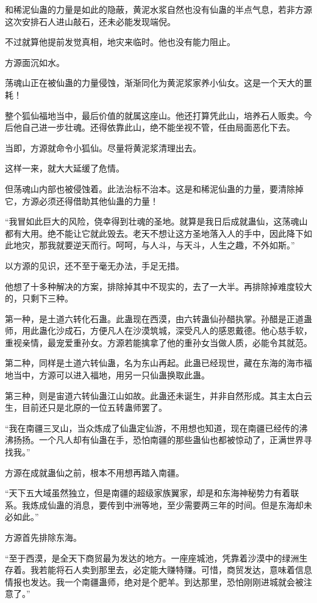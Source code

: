 \begin{this_body}
和稀泥仙蛊的力量是如此的隐蔽，黄泥水浆自然也没有仙蛊的半点气息，若非方源这次安排石人进山敲石，还未必能发现端倪。

不过就算他提前发觉真相，地灾来临时。他也没有能力阻止。

方源面沉如水。

荡魂山正在被仙蛊的力量侵蚀，渐渐同化为黄泥浆家养小仙女。这是一个天大的噩耗！

整个狐仙福地当中，最后价值的就属这座山。他还打算凭此山，培养石人贩卖。今后他自己进一步壮魂。还得依靠此山，绝不能坐视不管，任由局面恶化下去。

当即，方源就命令小狐仙。尽量将黄泥浆清理出去。

这样一来，就大大延缓了危情。

但荡魂山内部也被侵蚀着。此法治标不治本。这是和稀泥仙蛊的力量，要清除掉它，方源必须还得借助其他仙蛊的力量！

“我冒如此巨大的风险，侥幸得到壮魂的圣地。就算是我日后成就蛊仙，这荡魂山都有大用。绝不能让它就此毁去。老天不想让这方圣地落入人的手中，因此降下如此地灾，那我就要逆天而行。呵呵，与人斗，与天斗，人生之趣，不外如斯。”

以方源的见识，还不至于毫无办法，手足无措。

他想了十多种解决的方案，排除掉其中不现实的，去了一大半。再排除掉难度较大的，只剩下三种。

第一种，是土道六转化石蛊。此蛊现在西漠，由六转蛊仙孙醋执掌。孙醋是正道蛊师，用此蛊化沙成石，方便凡人在沙漠筑城，深受凡人的感恩戴德。他心慈手软，重视亲情，最宠爱重孙女。方源若能擒拿了他的重孙女当做人质，必能令其就范。

第二种，同样是土道六转仙蛊，名为东山再起。此蛊已经现世，藏在东海的海市福地当中，方源可以进入福地，用另一只仙蛊换取此蛊。

第三种，则是宙道六转仙蛊江山如故。此蛊还未诞生，并非自然形成。其主太白云生，目前还只是北原的一位五转蛊师罢了。

“我在南疆三叉山，当众炼成了仙蛊定仙游，不用想也知道，现在南疆已经传的沸沸扬扬。一个凡人却有仙蛊在手，恐怕南疆的那些蛊仙也都被惊动了，正满世界寻找我。”

方源在成就蛊仙之前，根本不用想再踏入南疆。

“天下五大域虽然独立，但是南疆的超级家族翼家，却是和东海神秘势力有着联系。我炼成仙蛊的消息，要传到中洲等地，至少需要两三年的时间。但是东海却未必如此。”

方源首先排除东海。

“至于西漠，是全天下商贸最为发达的地方。一座座城池，凭靠着沙漠中的绿洲生存着。我若能将石人卖到那里去，必定能大赚特赚。可惜，商贸发达，意味着信息情报也发达。我一个南疆蛊师，绝对是个肥羊。到达那里，恐怕刚刚进城就会被注意了。”


\end{this_body}
